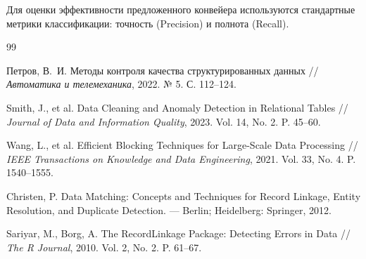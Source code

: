 \documentclass{misisarticle}
\begin{document}
Для оценки эффективности предложенного конвейера используются стандартные метрики классификации: точность (Precision) и полнота (Recall).

\begin{thebibliography}{99}

Петров, В.~И. Методы контроля качества структурированных данных // \textit{Автоматика и телемеханика}, 2022. № 5. С. 112--124.

Smith, J., et al. Data Cleaning and Anomaly Detection in Relational Tables // \textit{Journal of Data and Information Quality}, 2023. Vol. 14, No. 2. P. 45--60.

Wang, L., et al. Efficient Blocking Techniques for Large-Scale Data Processing // \textit{IEEE Transactions on Knowledge and Data Engineering}, 2021. Vol. 33, No. 4. P. 1540--1555.

Christen, P. Data Matching: Concepts and Techniques for Record Linkage, Entity Resolution, and Duplicate Detection. — Berlin; Heidelberg: Springer, 2012.

Sariyar, M., Borg, A. The RecordLinkage Package: Detecting Errors in Data // \textit{The R Journal}, 2010. Vol. 2, No. 2. P. 61--67.

\end{thebibliography}
\end{document}
